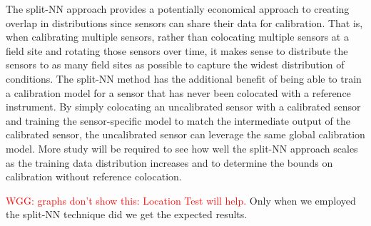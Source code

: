 \documentclass[journal abbreviation, manuscript]{copernicus}
\newcommand\todo[1]{\textcolor{red}{#1}}
\begin{document}
The split-NN approach provides a potentially economical approach to creating overlap in distributions since sensors can share their data for calibration.  That is, when calibrating multiple sensors, rather than colocating multiple sensors at a field site and rotating those sensors over time, it makes sense to distribute the sensors to as many field sites as possible to capture the widest distribution of conditions. The split-NN method has the additional benefit of being able to train a calibration model for a sensor that has never been colocated with a reference instrument. By simply colocating an uncalibrated sensor with a calibrated sensor and training the sensor-specific model to match the intermediate output of the calibrated sensor, the uncalibrated sensor can leverage the same global calibration model. More study will be required to see how well the split-NN approach scales as the training data distribution increases and to determine the bounds on calibration without reference colocation.

\todo{WGG: graphs don't show this: Location Test will help.} Only when we employed the split-NN technique did we get the expected results.

% 

\end{document}
